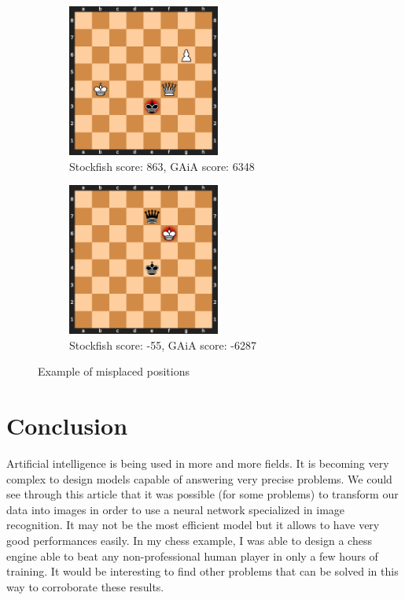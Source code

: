 \documentclass[a4paper]{article}
\begin{document}
\begin{figure}[H]
  \centering
  \begin{subfigure}{.5\textwidth}
    \centering
    \includegraphics[width=5cm]{misplaced/pos1.pdf}
    \caption{Stockfish score: 863, GAiA score: 6348}
  \end{subfigure}%
  \begin{subfigure}{.5\textwidth}
    \centering
    \includegraphics[width=5cm]{misplaced/pos2.pdf}
    \caption{Stockfish score: -55, GAiA score: -6287}
  \end{subfigure}
  \caption{Example of misplaced positions}
  \label{fig:misplaced}
  \end{figure}

\pagebreak
\section{Conclusion}
Artificial intelligence is being used in more and more fields.
It is becoming very complex to design models capable of answering very precise problems.
We could see through this article that it was possible (for some problems) to transform
our data into images in order to use a neural network specialized in image recognition.
It may not be the most efficient model but it allows to have very good performances easily.
In my chess example, I was able to design a chess engine able to beat any non-professional
human player in only a few hours of training. It would be interesting to find other problems
that can be solved in this way to corroborate these results.



\end{document}
